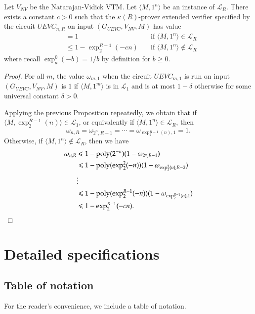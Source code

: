 \documentclass[11pt,letterpaper]{article}
\begin{document}
\begin{corollary}
Let $V_{NV}$ be the Natarajan-Vidick VTM. Let $\langle M,1^n \rangle$ be an instance of $\mathcal{L}_R$. There exists a constant $c > 0$ such that the $\kappa(R)$-prover extended verifier specified by the circuit $UEVC_{n,R}$ on input $(G_{UEVC},V_{NV},M)$ has value 
\begin{align*}
		&= 1  \quad & \text{if } \langle M,1^n \rangle\in \mathcal{L}_R \\
		&\leq 1 - \exp^{R-1}_2(-cn) \quad &\text{if } \langle M,1^n \rangle\notin \mathcal{L}_R
\end{align*}
where recall $\exp^0_a(-b) = 1/b$ by definition for $b \geq 0$.
\end{corollary}
\begin{proof}
	For all $m$, the value $\omega_{m,1}$ when the circuit $UEVC_{m,1}$ is run on input $(G_{UEVC},V_{NV},M)$ is $1$ if $\langle M,1^m \rangle$ is in $\mathcal{L}_1$ and is at most $1 - \delta$ otherwise for some universal constant $\delta > 0$.
	
	Applying the previous Proposition repeatedly, we obtain that if $\langle M,\exp^{R-1}_2(n) \rangle \in \mathcal{L}_1$, or equivalently if $\langle M,1^n \rangle \in \mathcal{L}_R$, then
	\[
		\omega_{n,R} = \omega_{2^n,R-1} = \cdots = \omega_{\exp^{R-1}_2(n),1} = 1.
	\]
	Otherwise, if  $\langle M,1^n \rangle \notin \mathcal{L}_R$, then we have
	\begin{align*}
		\omega_{n,R} &\leqslant 1 - \operatorname{poly}(2^{-n})(1-\omega_{2^n,R-1}) \\
					&\leqslant 1 - \operatorname{poly}(\exp^2_2(-n))(1- \omega_{\exp^2_2(n),R-2}) \\
					&\vdots \\
					&\leqslant 1 - \operatorname{poly}(\exp^{R-1}_2(-n))(1-\omega_{\exp^{R-1}_2(n),1}) \\
					&\leqslant 1 - \exp^{R-1}_2(-cn).
	\end{align*}
\end{proof}


\section{Detailed specifications}

\subsection{Table of notation}

For the reader's convenience, we include a table of notation.
\end{document}
